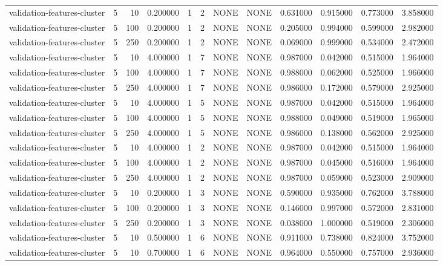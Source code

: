 \begin{tabular}{lrrrllllrrrr}
validation-features-cluster & 5 & 10 & 0.200000 & 1 & 2 & NONE & NONE & 0.631000 & 0.915000 & 0.773000 & 3.858000 \\
validation-features-cluster & 5 & 100 & 0.200000 & 1 & 2 & NONE & NONE & 0.205000 & 0.994000 & 0.599000 & 2.982000 \\
validation-features-cluster & 5 & 250 & 0.200000 & 1 & 2 & NONE & NONE & 0.069000 & 0.999000 & 0.534000 & 2.472000 \\
validation-features-cluster & 5 & 10 & 4.000000 & 1 & 7 & NONE & NONE & 0.987000 & 0.042000 & 0.515000 & 1.964000 \\
validation-features-cluster & 5 & 100 & 4.000000 & 1 & 7 & NONE & NONE & 0.988000 & 0.062000 & 0.525000 & 1.966000 \\
validation-features-cluster & 5 & 250 & 4.000000 & 1 & 7 & NONE & NONE & 0.986000 & 0.172000 & 0.579000 & 2.925000 \\
validation-features-cluster & 5 & 10 & 4.000000 & 1 & 5 & NONE & NONE & 0.987000 & 0.042000 & 0.515000 & 1.964000 \\
validation-features-cluster & 5 & 100 & 4.000000 & 1 & 5 & NONE & NONE & 0.988000 & 0.049000 & 0.519000 & 1.965000 \\
validation-features-cluster & 5 & 250 & 4.000000 & 1 & 5 & NONE & NONE & 0.986000 & 0.138000 & 0.562000 & 2.925000 \\
validation-features-cluster & 5 & 10 & 4.000000 & 1 & 2 & NONE & NONE & 0.987000 & 0.042000 & 0.515000 & 1.964000 \\
validation-features-cluster & 5 & 100 & 4.000000 & 1 & 2 & NONE & NONE & 0.987000 & 0.045000 & 0.516000 & 1.964000 \\
validation-features-cluster & 5 & 250 & 4.000000 & 1 & 2 & NONE & NONE & 0.987000 & 0.059000 & 0.523000 & 2.909000 \\
validation-features-cluster & 5 & 10 & 0.200000 & 1 & 3 & NONE & NONE & 0.590000 & 0.935000 & 0.762000 & 3.788000 \\
validation-features-cluster & 5 & 100 & 0.200000 & 1 & 3 & NONE & NONE & 0.146000 & 0.997000 & 0.572000 & 2.831000 \\
validation-features-cluster & 5 & 250 & 0.200000 & 1 & 3 & NONE & NONE & 0.038000 & 1.000000 & 0.519000 & 2.306000 \\
validation-features-cluster & 5 & 10 & 0.500000 & 1 & 6 & NONE & NONE & 0.911000 & 0.738000 & 0.824000 & 3.752000 \\
validation-features-cluster & 5 & 10 & 0.700000 & 1 & 6 & NONE & NONE & 0.964000 & 0.550000 & 0.757000 & 2.936000 \\

\end{tabular}
